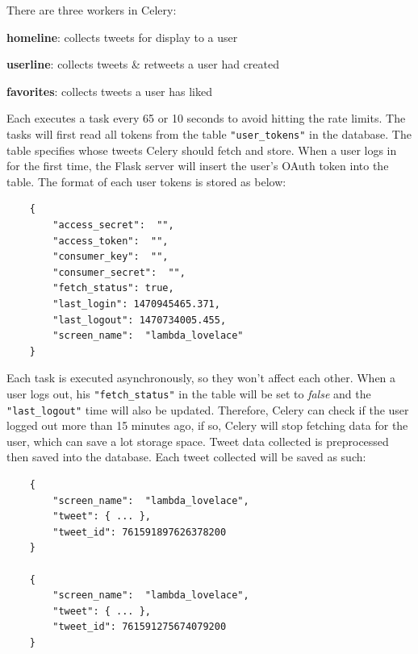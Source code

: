 \documentclass{article}
\begin{document}
\begin{samepage}
\noindent There are three workers in Celery:

\begin{itemize*}
    \item \textbf{homeline}: collects tweets for display to a user
    \item \textbf{userline}: collects tweets \& retweets a user had created
    \item \textbf{favorites}: collects tweets a user has liked
\end{itemize*}
\end{samepage}

\noindent Each executes a task every 65 or 10 seconds to avoid hitting the rate limits. The tasks will first read all tokens from the table \texttt{"user\_tokens"} in the database. The table specifies whose tweets Celery should fetch and store. When a user logs in for the first time, the Flask server will insert the user’s OAuth token into the table. The format of each user tokens is stored as below:

\begin{samepage}
\begin{verbatim}
    {
        "access_secret":  "", 
        "access_token":  "", 
        "consumer_key":  "", 
        "consumer_secret":  "",
        "fetch_status": true,
        "last_login": 1470945465.371,
        "last_logout": 1470734005.455,
        "screen_name":  "lambda_lovelace"
    }
\end{verbatim}
\end{samepage}

\noindent Each task is executed asynchronously, so they won’t affect each other. When a user logs out, his \texttt{"fetch\_status"} in the table will be set to \textit{false} and the \texttt{"last\_logout"} time will also be updated. Therefore, Celery can check if the user logged out more than 15 minutes ago, if so, Celery will stop fetching data for the user, which can save a lot storage space. Tweet data collected is preprocessed then saved into the database. Each tweet collected will be saved as such:

\begin{samepage}
\begin{verbatim}
    {
        "screen_name":  "lambda_lovelace",
        "tweet": { ... },
        "tweet_id": 761591897626378200
    } 
    
    {
        "screen_name":  "lambda_lovelace",
        "tweet": { ... },
        "tweet_id": 761591275674079200
    }
\end{verbatim}
\end{samepage}
\end{document}
